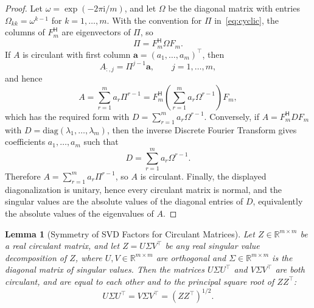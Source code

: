 \documentclass[11pt]{article}
\newtheorem{lemma}{Lemma}
\begin{document}
\begin{proof}
Let \(\omega=\exp(-2\pi \mathrm{i}/m)\), and let \(\Omega\) be the diagonal matrix with entries \(\Omega_{kk}=\omega^{k-1}\) for \(k=1,\ldots,m\). With the convention for \(\Pi\) in~\cref{eq:cyclic}, the columns of \(F_m^{\mathsf{H}}\) are eigenvectors of \(\Pi\), so
\[
\Pi=F_m^{\mathsf{H}}\Omega F_m.
\]
If \(A\) is circulant with first column \(\boldsymbol a=(a_1,\ldots,a_m)^\top\), then
\[
A_{:,j}=\Pi^{j-1}\boldsymbol a,\qquad j=1,\ldots,m,
\]
and hence
\[
A=\sum_{r=1}^{m}a_r\Pi^{r-1}
  =F_m^{\mathsf{H}}\left(\sum_{r=1}^{m}a_r\Omega^{r-1}\right)F_m,
\]
which has the required form with \(D=\sum_{r=1}^{m}a_r\Omega^{r-1}\). Conversely, if \(A=F_m^{\mathsf{H}}DF_m\) with \(D=\mathrm{diag}(\lambda_1,\ldots,\lambda_m)\), then the inverse Discrete Fourier Transform gives coefficients \(a_1,\ldots,a_m\) such that
\[
D=\sum_{r=1}^{m}a_r\Omega^{r-1}.
\]
Therefore \(A=\sum_{r=1}^{m}a_r\Pi^{r-1}\), so \(A\) is circulant. Finally, the displayed diagonalization is unitary, hence every circulant matrix is normal, and the singular values are the absolute values of the diagonal entries of \(D\), equivalently the absolute values of the eigenvalues of \(A\).
\end{proof}

\begin{lemma}[Symmetry of SVD Factors for Circulant Matrices]
\label{lem:svd_factor_symmetry}
Let \(Z \in \mathbb{R}^{m \times m}\) be a real circulant matrix, and let \(Z=U\Sigma V^\top\) be any real singular value decomposition of \(Z\), where \(U, V \in \mathbb{R}^{m \times m}\) are orthogonal and \(\Sigma \in \mathbb{R}^{m \times m}\) is the diagonal matrix of singular values.
Then the matrices \(U\Sigma U^\top\) and \(V\Sigma V^\top\) are both circulant, and are equal to each other and to the principal square root of \(ZZ^\top\):
\[ U\Sigma U^\top = V\Sigma V^\top = (ZZ^\top)^{1/2}. \]
\end{lemma}
\end{document}
